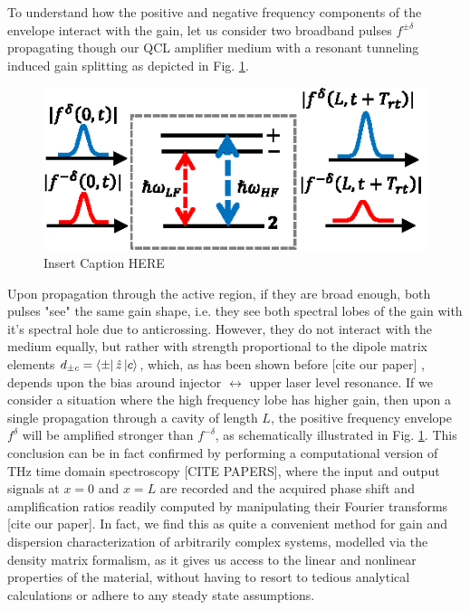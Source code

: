 \documentclass[journal]{IEEEtran}
\def\h{\hat}
\begin{document}
To understand how the positive and negative frequency components of the envelope interact with the gain, let us consider two broadband pulses $f^{\pm\delta}$ propagating though our QCL amplifier medium with a resonant tunneling induced gain splitting as depicted in Fig. \ref{fig:img03}. 
\begin{figure}[h!]
	\begin{center}
		\includegraphics[scale=1.1]{IMGS/THB_pulse_interaction.eps}
		\caption{ Insert Caption HERE} \label{fig:img03}
	\end{center}	
\end{figure}
Upon propagation through the active region, if they are broad enough, both pulses "see" the same gain shape, i.e. they see both spectral lobes of the gain with it's spectral hole due to anticrossing. However, they do not interact with the medium equally, but rather with strength proportional to the dipole matrix elements $d_{\pm c} = \bra{\pm}\h{z}\ket{c}$, which, as has been shown before [cite our paper] \cite{dupont2010simplified}, depends upon the bias around injector $\leftrightarrow$ upper laser level resonance. If we consider a situation where the high frequency lobe has higher gain, then upon a single propagation through a cavity of length $L$, the positive frequency envelope $f^{\delta}$ will be amplified stronger than $f^{-\delta}$, as schematically illustrated in Fig. \ref{fig:img03}. This conclusion can be in fact confirmed by performing a computational version of THz time domain spectroscopy [CITE PAPERS],  where the input and output signals at $x=0$ and $x=L$ are recorded and the acquired phase shift and amplification ratios readily computed by manipulating their Fourier transforms [cite our paper]. In fact, we find this as quite a convenient method for gain and dispersion characterization of arbitrarily complex systems, modelled via the density matrix formalism, as it gives us access to the linear and nonlinear properties of the material, without having to resort to tedious analytical calculations or adhere to any steady state assumptions. 
\end{document}
